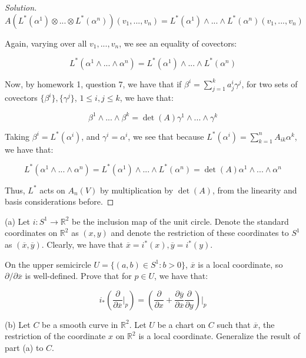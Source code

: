 \documentclass[10pt]{article}
\theoremstyle{nonumberplain}%
\newenvironment{problem}[2][]{\begin{trivlist}
\item[\hskip \labelsep {\bfseries #1}\hskip \labelsep {\bfseries #2.}]}{\end{trivlist}}
\begin{document}
\begin{proof}[Solution]
$$  A(L^*(\alpha^1) \otimes ... \otimes L^*(\alpha^n))(v_1,...,v_n) = L^*(\alpha^1) \wedge ... \wedge L^*(\alpha^n)(v_1,...,v_n) $$

Again, varying over all $v_1,...,v_n$, we see an equality of covectors:

$$  L^*(\alpha^1 \wedge ... \wedge \alpha^n) =  L^*(\alpha^1) \wedge ... \wedge L^*(\alpha^n) $$

Now, by homework 1, question 7, we have that if $ \beta^i  = \sum_{j=1}^k a_j^i \gamma^j$, for two sets of covectors $\{\beta^i\},\{ \gamma^j\}$, $1 \leq i,j \leq k$, we have that:

$$ \beta^1 \wedge ... \wedge \beta^k = \det(A) \gamma^1 \wedge ... \wedge \gamma^k$$

Taking $\beta^i = L^*(\alpha^i)$, and $\gamma^i = \alpha^i$, we see that because $ L^*(\alpha^i) = \sum_{k=1}^n A_{ik}\alpha^k$, we have that:

$$  L^*(\alpha^1 \wedge ... \wedge \alpha^n) =  L^*(\alpha^1) \wedge ... \wedge L^*(\alpha^n) = \det(A) \alpha^1 \wedge ... \wedge \alpha^n $$

Thus, $L^*$ acts on $A_n(V)$ by multiplication by $\det(A)$, from the linearity and basis considerations before.

\end{proof}

\begin{problem}{Question 3}

(a) Let $i: S^1 \to \mathbb{R}^2$ be the inclusion map of the unit circle. Denote the standard coordinates on $\mathbb{R}^2$ as $(x,y)$ and denote the restriction of these coordinates to $S^1$ as $(\overline{x}, \overline{y})$. Clearly, we have that $\overline{x} = i^*(x), \overline{y} = i^*(y)$. 

On the upper semicircle $U = \{ (a,b) \in S^1 : b > 0 \}$, $\overline{x}$ is a local coordinate, so $\partial/\partial \overline{x}$ is well-defined. Prove that for $p\in U$, we have that:

$$i_* \left( \frac{\partial}{\partial \overline{x}} \bigg|_p \right) = \left( \frac{\partial}{\partial x} + \frac{\partial \overline{y}}{\partial \overline{x}} \frac{\partial}{\partial y} \right)\bigg|_p$$

(b) Let $C$ be a smooth curve in $\mathbb{R}^2$. Let $U$ be a chart on $C$ such that $\overline{x}$, the restriction of the coordinate $x$ on $\mathbb{R}^2$ is a local coordinate. Generalize the result of part (a) to $C$.

\end{problem}
\end{document}
